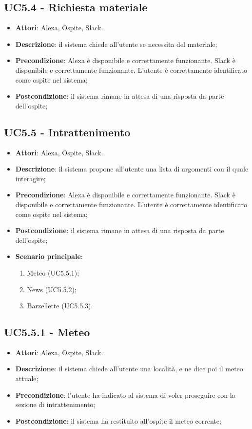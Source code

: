 \documentclass[../AnalisiDeiRequisiti.tex]{subfiles}
\begin{document}
\subsection{UC5.4 - Richiesta materiale} 
\label{sssec:UC5.4} 
\begin{itemize} 
\item \textbf{Attori}: Alexa, Ospite, Slack.
\item \textbf{Descrizione}: il sistema chiede all'utente se necessita del materiale;
\item \textbf{Precondizione}: Alexa è disponibile e correttamente funzionante. Slack è disponibile e correttamente funzionante. L'utente è correttamente identificato come ospite nel sistema;
\item \textbf{Postcondizione}: il sistema rimane in attesa di una risposta da parte dell'ospite;
\end{itemize} 
\subsection{UC5.5 - Intrattenimento} 
\label{sssec:UC5.5} 
\begin{itemize} 
\item \textbf{Attori}: Alexa, Ospite, Slack.
\item \textbf{Descrizione}: il sistema propone all'utente una lista di argomenti con il quale interagire;
\item \textbf{Precondizione}: Alexa è disponibile e correttamente funzionante. Slack è disponibile e correttamente funzionante. L'utente è correttamente identificato come ospite nel sistema;
\item \textbf{Postcondizione}: il sistema rimane in attesa di una risposta da parte dell'ospite;
\item \textbf{Scenario principale}: \begin{enumerate}\item Meteo (UC5.5.1);\item News (UC5.5.2);\item Barzellette (UC5.5.3). 
 \end{enumerate}
\end{itemize} 
\subsection{UC5.5.1 - Meteo} 
\label{sssec:UC5.5.1} 
\begin{itemize} 
\item \textbf{Attori}: Alexa, Ospite, Slack.
\item \textbf{Descrizione}: il sistema chiede all'utente una località, e ne dice poi il meteo attuale;
\item \textbf{Precondizione}: l'utente ha indicato al sistema di voler proseguire con la sezione di intrattenimento;
\item \textbf{Postcondizione}: il sistema ha restituito all'ospite il meteo corrente;
\end{itemize} 
\end{document}
